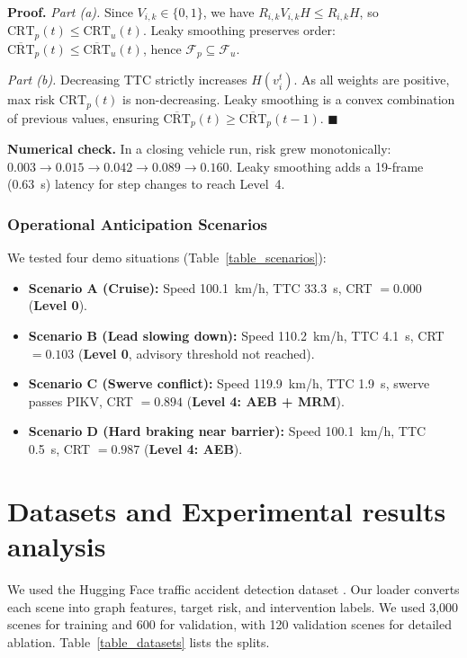 \documentclass[preprint,12pt]{elsarticle}
\begin{document}
\textbf{Proof.} \textit{Part (a).} Since $V_{i,k} \in \{0, 1\}$, we have $R_{i,k} V_{i,k} H \le R_{i,k} H$, so $\text{CRT}_p(t) \le \text{CRT}_u(t)$. Leaky smoothing preserves order: $\overline{\text{CRT}}_p(t) \le \overline{\text{CRT}}_u(t)$, hence $\mathcal{F}_p \subseteq \mathcal{F}_u$.

\textit{Part (b).} Decreasing TTC strictly increases $H(v_i^t)$. As all weights are positive, max risk $\text{CRT}_p(t)$ is non-decreasing. Leaky smoothing is a convex combination of previous values, ensuring $\overline{\text{CRT}}_p(t) \ge \overline{\text{CRT}}_p(t-1)$. \hfill $\blacksquare$

\textbf{Numerical check.} In a closing vehicle run, risk grew monotonically: $0.003 \rightarrow 0.015 \rightarrow 0.042 \rightarrow 0.089 \rightarrow 0.160$. Leaky smoothing adds a 19-frame (0.63~s) latency for step changes to reach Level~4.

\subsubsection{Operational Anticipation Scenarios}
We tested four demo situations (Table~\ref{table_scenarios}):
\begin{itemize}
    \item \textbf{Scenario A (Cruise):} Speed 100.1~km/h, TTC 33.3~s, CRT $= 0.000$ (\textbf{Level 0}).
    \item \textbf{Scenario B (Lead slowing down):} Speed 110.2~km/h, TTC 4.1~s, CRT $= 0.103$ (\textbf{Level 0}, advisory threshold not reached).
    \item \textbf{Scenario C (Swerve conflict):} Speed 119.9~km/h, TTC 1.9~s, swerve passes PIKV, CRT $= 0.894$ (\textbf{Level 4: AEB + MRM}).
    \item \textbf{Scenario D (Hard braking near barrier):} Speed 100.1~km/h, TTC 0.5~s, CRT $= 0.987$ (\textbf{Level 4: AEB}).
\end{itemize}

\section{Datasets and Experimental results analysis} \label{section4}
We used the Hugging Face traffic accident detection dataset \cite{hiennguyen2024accident}. Our loader converts each scene into graph features, target risk, and intervention labels. We used 3,000 scenes for training and 600 for validation, with 120 validation scenes for detailed ablation. Table~\ref{table_datasets} lists the splits.
\end{document}
